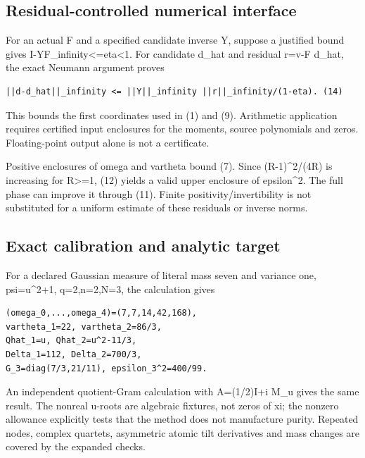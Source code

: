 \subsection[\hspace{0.4em}Residual-controlled numerical
interface]{Residual-controlled numerical
interface}\label{confluent-transfer-residual-controlled-numerical-interface}

For an actual F and a specified candidate inverse Y, suppose a justified
bound gives
\textbar\textbar I-YF\textbar\textbar\_infinity\textless=eta\textless1.
For candidate d\_hat and residual r=v-F d\_hat, the exact Neumann
argument proves

\begin{Verbatim}[breaklines=true,breakanywhere=true,fontsize=\small]
||d-d_hat||_infinity <= ||Y||_infinity ||r||_infinity/(1-eta). (14)
\end{Verbatim}

This bounds the first coordinates used in (1) and (9). Arithmetic
application requires certified input enclosures for the moments, source
polynomials and zeros. Floating-point output alone is not a certificate.

Positive enclosures of omega and vartheta bound (7). Since
(R-1)\^{}2/(4R) is increasing for R\textgreater=1, (12) yields a valid
upper enclosure of epsilon\^{}2. The full phase can improve it through
(11). Finite positivity/invertibility is not substituted for a uniform
estimate of these residuals or inverse norms.

\subsection[\hspace{0.4em}Exact calibration and analytic
target]{Exact calibration and analytic
target}\label{confluent-transfer-exact-calibration-and-analytic-target}

For a declared Gaussian measure of literal mass seven and variance one,
psi=u\^{}2+1, q=2,n=2,N=3, the calculation gives

\begin{Verbatim}[breaklines=true,breakanywhere=true,fontsize=\small]
(omega_0,...,omega_4)=(7,7,14,42,168),
vartheta_1=22, vartheta_2=86/3,
Qhat_1=u, Qhat_2=u^2-11/3,
Delta_1=112, Delta_2=700/3,
G_3=diag(7/3,21/11), epsilon_3^2=400/99.
\end{Verbatim}

An independent quotient-Gram calculation with A=(1/2)I+i M\_u gives the
same result. The nonreal u-roots are algebraic fixtures, not zeros of
xi; the nonzero allowance explicitly tests that the method does not
manufacture purity. Repeated nodes, complex quartets, asymmetric atomic
tilt derivatives and mass changes are covered by the expanded checks.

